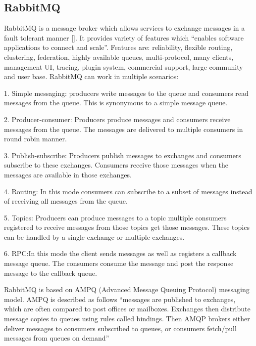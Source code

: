 \subsection{RabbitMQ }

RabbitMQ is a message broker which allows services to exchange
messages in a fault tolerant manner [\cite{www-rabbitmq}].  It provides
variety of features which ``enables software applications to connect
and scale''. Features are: reliability, flexible routing, clustering,
federation, highly available queues, multi-protocol, many clients,
management UI, tracing, plugin system, commercial support, large
community and user base. RabbitMQ can work in multiple scenarios:

     1. Simple messaging: producers write messages to the queue and
        consumers read messages from the queue. This is synonymous
        to a simple message queue.

     2. Producer-consumer: Producers produce messages and consumers
        receive messages from the queue. The messages are delivered to
        multiple consumers in round robin manner.

     3. Publish-subscribe: Producers publish messages to exchanges
        and consumers subscribe to these exchanges. Consumers receive
        those messages when the messages are available in those
        exchanges.

     4. Routing: In this mode consumers can subscribe to a subset
        of messages instead of receiving all messages from the queue.

     5. Topics: Producers can produce messages to a topic multiple
        consumers registered to receive messages from those topics get
        those messages. These topics can be handled by a single
        exchange or multiple exchanges.

     6. RPC:In this mode the client sends messages as well as
        registers a callback message queue. The consumers consume the
        message and post the response message to the callback queue.

        RabbitMQ is based on AMPQ (Advanced
        Message Queuing Protocol) messaging model\cite{ampq-article}.
        AMPQ is described
        as follows ``messages are published to exchanges, which are
        often compared to post offices or mailboxes. Exchanges then
        distribute message copies to queues using rules called
        bindings. Then AMQP brokers either deliver messages to
        consumers subscribed to queues, or consumers fetch/pull
        messages from queues on demand''


